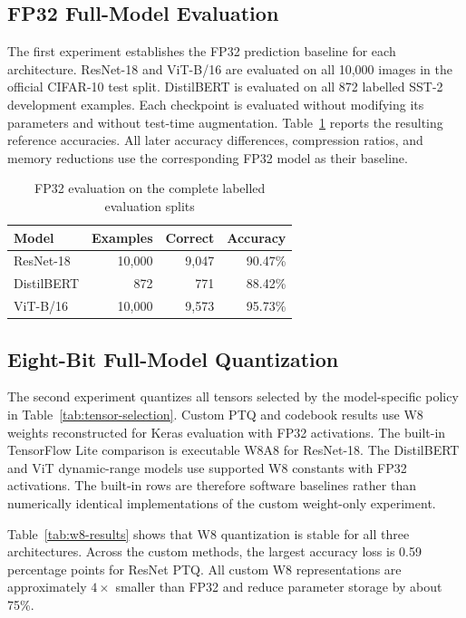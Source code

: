 \documentclass[conference]{IEEEtran}
\begin{document}
\subsection{FP32 Full-Model Evaluation}

The first experiment establishes the FP32 prediction baseline for each architecture. ResNet-18 and ViT-B/16 are evaluated on all 10,000 images in the official CIFAR-10 test split. DistilBERT is evaluated on all 872 labelled SST-2 development examples. Each checkpoint is evaluated without modifying its parameters and without test-time augmentation. Table~\ref{tab:fp32-evaluation} reports the resulting reference accuracies. All later accuracy differences, compression ratios, and memory reductions use the corresponding FP32 model as their baseline.

\begin{table}[t]
\caption{FP32 evaluation on the complete labelled evaluation splits}
\label{tab:fp32-evaluation}
\centering
\small
\begin{tabular}{@{}lrrr@{}}
\toprule
Model & Examples & Correct & Accuracy \\
\midrule
ResNet-18 & 10,000 & 9,047 & 90.47\% \\
DistilBERT & 872 & 771 & 88.42\% \\
ViT-B/16 & 10,000 & 9,573 & 95.73\% \\
\bottomrule
\end{tabular}
\end{table}

\subsection{Eight-Bit Full-Model Quantization}

The second experiment quantizes all tensors selected by the model-specific policy in Table~\ref{tab:tensor-selection}. Custom PTQ and codebook results use W8 weights reconstructed for Keras evaluation with FP32 activations. The built-in TensorFlow Lite comparison is executable W8A8 for ResNet-18. The DistilBERT and ViT dynamic-range models use supported W8 constants with FP32 activations. The built-in rows are therefore software baselines rather than numerically identical implementations of the custom weight-only experiment.

Table~\ref{tab:w8-results} shows that W8 quantization is stable for all three architectures. Across the custom methods, the largest accuracy loss is 0.59 percentage points for ResNet PTQ. All custom W8 representations are approximately $4\times$ smaller than FP32 and reduce parameter storage by about 75\%.
\end{document}
